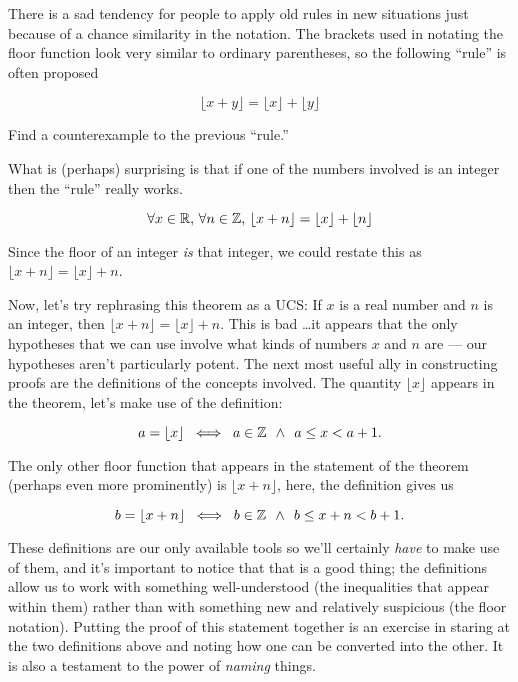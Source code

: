 There is a sad tendency for people to apply old rules in new situations 
just because of a chance similarity in the notation.  The brackets used 
in notating the floor function look very similar to ordinary parentheses, 
so the following ``rule'' is often proposed

\[ \lfloor x + y \rfloor = \lfloor x \rfloor + \lfloor y \rfloor \]

\begin{exer} 
Find a counterexample to the previous ``rule.''
\end{exer}

What is (perhaps) surprising is that if one of the numbers involved is an
integer then the ``rule'' really works.

\begin{thm}
\[ \forall x \in {\mathbb R}, \, \forall n \in {\mathbb Z}, \, 
\lfloor x + n \rfloor = \lfloor x \rfloor + \lfloor n \rfloor \]
\end{thm}

Since the floor of an integer {\em is} that integer, we could restate this
as $ \lfloor x + n \rfloor = \lfloor x \rfloor +  n$. 

Now, let's try rephrasing this theorem as a UCS:  If $x$ is a real number
and $n$ is an integer, then $\lfloor x + n \rfloor = \lfloor x \rfloor +  n$.
This is bad \ldots it appears that the only hypotheses that we can use
involve what kinds of numbers $x$ and $n$ are --- our hypotheses aren't
particularly potent.  The next most useful ally in constructing proofs
are the definitions of the concepts involved.  The quantity 
$\lfloor x \rfloor$ appears in the theorem, let's make
use of the definition:

\[ a = \lfloor x  \rfloor \; \iff \; a \in {\mathbb Z} \; \, 
\land \; \, a \leq x < a+1. \]

The only other floor function that appears in the statement of the theorem
(perhaps even more prominently) 
is $\lfloor x + n\rfloor$, here, the definition gives us
 
\[ b = \lfloor x + n \rfloor \; \iff \; 
b \in {\mathbb Z} \; \, \land \; \, b \leq x + n < b+1. \]

These definitions are our only available tools so we'll certainly \emph{have}
to make use of them, and it's important to notice that that is a good thing;
the definitions allow us to work with something well-understood 
(the inequalities that appear within them) rather than with something 
new and relatively suspicious (the floor notation).  Putting the proof 
of this statement together is an exercise in staring at the two definitions 
above and noting how one can be converted into the other.  It is also a 
testament to the power of \emph{naming} things.

